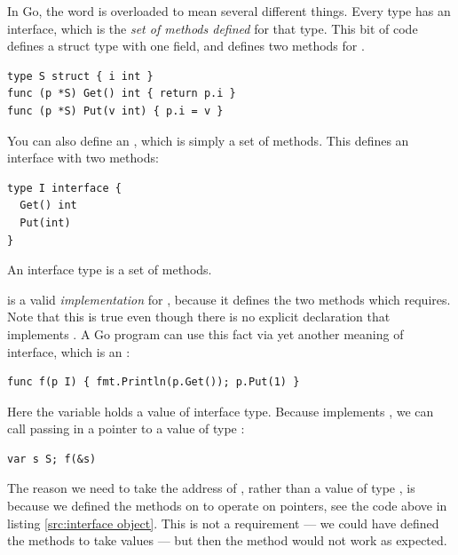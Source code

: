 \noindent{}
In Go, the word  is overloaded to mean several different
things. Every type has an interface, which is the \emph{set of methods
defined} for 
that type. This bit of code defines a struct type  with one field, and
defines two methods for .
\begin{lstlisting}[caption=Defining a struct and methods on it,label=src:interface object]
type S struct { i int }
func (p *S) Get() int { return p.i }
func (p *S) Put(v int) { p.i = v }
\end{lstlisting}
You can also define an , which is simply a set of methods.
This defines an interface  with two methods:
\begin{lstlisting}
type I interface {
  Get() int
  Put(int)
}
\end{lstlisting}
\begin{lbar}
An interface type is a set of methods.
\end{lbar}

 is a valid \emph{implementation} for , because it defines the two 
methods which  requires. Note that this is true even though there is 
no explicit declaration that  implements . A Go program can use 
this fact via yet another meaning of interface, which is an
:

\begin{lstlisting}
func f(p I) { fmt.Println(p.Get()); p.Put(1) }
\end{lstlisting}
Here the variable  holds a value of interface type. Because
implements , we can call  passing in a pointer to a value of type
:

\begin{lstlisting}
var s S; f(&s)
\end{lstlisting}
The reason we need to take the address of , rather than a value of type
, is because we defined the methods on  to operate on
pointers, see the code above in listing \ref{src:interface object}.
This
is not a requirement --- we could have defined the methods to take
values --- but then the  method would not work as expected.

